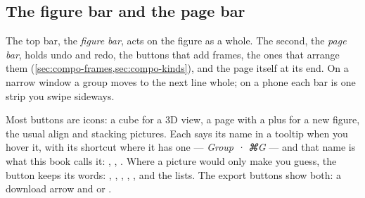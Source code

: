 \subsection{The figure bar and the page bar}

The top bar, the \emph{figure bar}, acts on the figure as a whole. The second, the \emph{page bar}, holds undo and redo, the buttons that add frames, the ones that arrange them (\cref{sec:compo-frames,sec:compo-kinds}), and the page itself at its end. On a narrow window a group moves to the next line whole; on a phone each bar is one strip you swipe sideways.

Most buttons are icons: a cube for a 3D view, a page with a plus for a new figure, the usual align and stacking pictures. Each says its name in a tooltip when you hover it, with its shortcut where it has one — \emph{Group · ⌘G} — and that name is what this book calls it: , , . Where a picture would only make you guess, the button keeps its words: , , , , , and the lists. The export buttons show both: a download arrow and  or .

